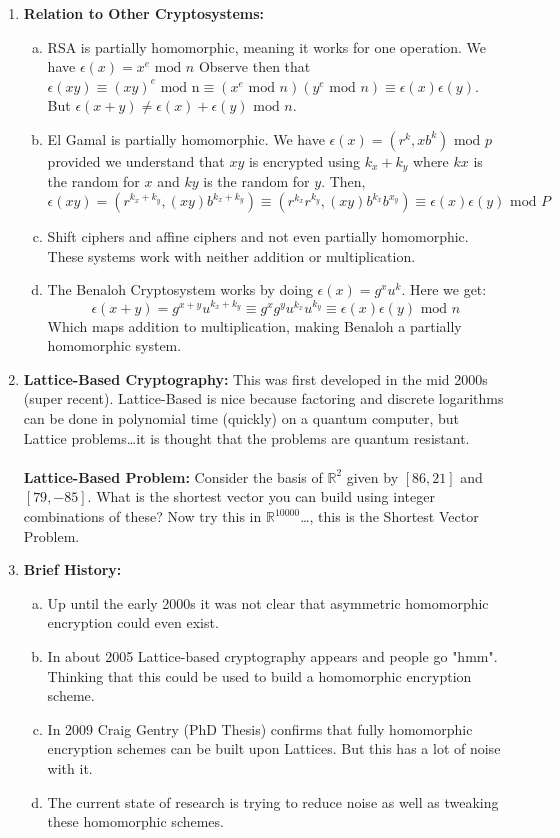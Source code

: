 \documentclass[class=article, crop=false]{standalone}
\def\reals{{\mathbb R}}
\begin{document}
\begin{enumerate}[1.]
	\item \textbf{Relation to Other Cryptosystems:}
	\begin{enumerate}[(a)]
		\item RSA is partially homomorphic, meaning it works for one operation. We have $\epsilon(x) = x^e\mbox{ mod }n$
		Observe then that $\epsilon (xy) \equiv (xy)^e\mbox{ mod n} \equiv (x^e\mbox{ mod }n) (y^e\mbox{ mod }n)\equiv \epsilon(x)\epsilon(y)$.
		But $\epsilon(x+y)\neq \epsilon(x) + \epsilon(y) \mbox{ mod }n$.

		\item El Gamal is partially homomorphic. We have $\epsilon(x) = (r^k, xb^k) \mbox{ mod }p$
		provided we understand that $xy$ is encrypted using $k_x+k_y$ where $kx$ is the random for $x$ and $ky$ is the random for $y$.
		Then, 
		$$\epsilon (xy) = (r^{k_x + k_y}, (xy)b^{k_x + k_y}) \equiv (r^{k_x}r^{k_y}, (xy)b^{k_x}b^{x_y})\equiv \epsilon(x) \epsilon(y) \mbox{ mod }P$$
	
		\item Shift ciphers and affine ciphers and not even partially homomorphic. These systems work with neither addition or multiplication.
		
		\item The Benaloh Cryptosystem works by doing $\epsilon(x) = g^x u^k$. Here we get:
		$$\epsilon(x+y) = g^{x+y} u^{k_x + k_y} \equiv g^x g^y u^{k_x} u^{k_y} \equiv \epsilon(x) \epsilon(y)\mbox{ mod }n$$
		Which maps addition to multiplication, making Benaloh a partially homomorphic system.
	\end{enumerate}

	\item \textbf{Lattice-Based Cryptography:}
	This was first developed in the mid 2000s (super recent).
	Lattice-Based is nice because factoring and discrete logarithms can be done in polynomial time (quickly)
	on a quantum computer, but Lattice problems\dots it is thought that the problems are quantum resistant. \\\\
	\textbf{Lattice-Based Problem:}
	Consider the basis of $\reals^2$ given by $[86, 21]$ and $[79, -85]$.
	What is the shortest vector you can build using integer combinations of these?
	Now try this in $\reals^{10000}$\ldots, this is the Shortest Vector Problem.

	\item \textbf{Brief History:}
	\begin{enumerate}[(a)]
		\item Up until the early 2000s it was not clear that asymmetric homomorphic encryption could even exist.
		\item In about 2005 Lattice-based cryptography appears and people go "hmm". Thinking that this could be used to build a homomorphic encryption scheme.
		\item In 2009 Craig Gentry (PhD Thesis) confirms that fully homomorphic encryption schemes can be built upon Lattices. But this has a lot of noise with  it.
		\item The current state of research is trying to reduce noise as well as tweaking these homomorphic schemes.
	\end{enumerate}


\end{enumerate}
\end{document}

